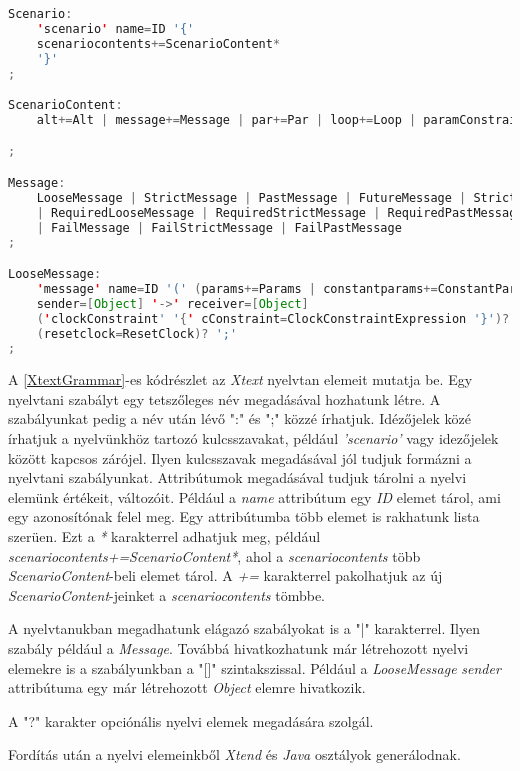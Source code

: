 \begin{lstlisting}[language=java, frame=single, float=ht!, caption={Xtext nyelvtan elemei.},captionpos=b, label=XtextGrammar]
Scenario:
	'scenario' name=ID '{'
	scenariocontents+=ScenarioContent*
	'}'
;

ScenarioContent:
	alt+=Alt | message+=Message | par+=Par | loop+=Loop | paramConstraint+=ParameterConstraint

;

Message:
	LooseMessage | StrictMessage | PastMessage | FutureMessage | StrictFutureMessage
	| RequiredLooseMessage | RequiredStrictMessage | RequiredPastMessage | RequiredFutureMessage | RequiredStrictFutureMessage
	| FailMessage | FailStrictMessage | FailPastMessage
;

LooseMessage:
	'message' name=ID '(' (params+=Params | constantparams+=ConstantParams) ')'
	sender=[Object] '->' receiver=[Object]
	('clockConstraint' '{' cConstraint=ClockConstraintExpression '}')? 
	(resetclock=ResetClock)? ';'
;
\end{lstlisting}

A \ref{XtextGrammar}-es kódrészlet az \textit{Xtext} nyelvtan elemeit mutatja be.
Egy nyelvtani szabályt egy tetszőleges név megadásával hozhatunk létre.
A szabályunkat pedig a név után lévő ":" és ";" közzé írhatjuk.
Idézőjelek közé írhatjuk a nyelvünkhöz tartozó kulcsszavakat, például \textit{'scenario'} vagy idezőjelek között kapcsos zárójel.
Ilyen kulcsszavak megadásával jól tudjuk formázni a nyelvtani szabályunkat.
Attribútumok megadásával tudjuk tárolni a nyelvi elemünk értékeit, változóit.
Például a \textit{name} attribútum egy \textit{ID} elemet tárol, ami egy azonosítónak felel meg.
Egy attribútumba több elemet is rakhatunk lista szerüen.
Ezt a \textit{*} karakterrel adhatjuk meg, például \textit{scenariocontents+=ScenarioContent*}, ahol a \textit{scenariocontents} több \textit{ScenarioContent}-beli elemet tárol.
A \textit{+=} karakterrel pakolhatjuk az új \textit{ScenarioContent}-jeinket a \textit{scenariocontents} tömbbe.

A nyelvtanukban megadhatunk elágazó szabályokat is a "|" karakterrel.
Ilyen szabály például a \textit{Message}.
Továbbá hivatkozhatunk már létrehozott nyelvi elemekre is a szabályunkban a "[]" szintakszissal.
Például a \textit{LooseMessage} \textit{sender} attribútuma egy már létrehozott \textit{Object} elemre hivatkozik.

A "?" karakter opciónális nyelvi elemek megadására szolgál.

Fordítás után a nyelvi elemeinkből \textit{Xtend} és \textit{Java} osztályok generálodnak.


